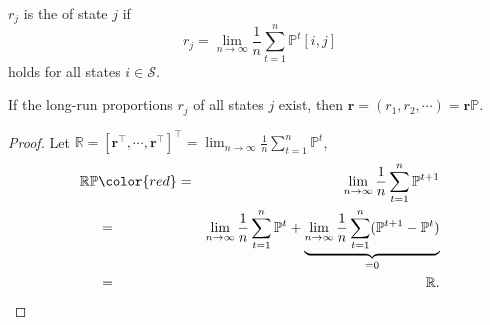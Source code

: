 \begin{definition}
$ r_{j} $ is the  of state $ j $ if
\[ r_{j} = \lim_{n \to \infty} \frac{1}{n} \sum_{t = 1}^{n} \mathbb{P}^{t}[i, j] \]
holds for all states $ i \in \mathcal{S} $.

\begin{comment}
Why this name?

Support $ N $ is a uniform distribution over $ \{ 1, \cdots, n \} $. The ``long-run proportion of state $ j $'' is
\begin{eqnarray*}
  &   & \lim_{n \to \infty} P(X(N) = j \mid X(0) = i) \\
  & = & \lim_{n \to \infty} P(X(N) = j \mid N = t, X(0) = i) \cdot P(N = t \mid X(0) = i) \\
  & = & \lim_{n \to \infty} P(X(N) = j \mid X(0) = i) \cdot \frac{1}{n} \\
  & = & \lim_{n \to \infty} \frac{1}{n} \sum_{t = 1}^{n} \mathbb{P}^{t}[i, j]
\end{eqnarray*}

(Proportion：state 在 t 時間內出現的比例有多高。)
\end{comment}
\end{definition}

\begin{lemma} \label{lem:r-eq-rp}
If the long-run proportions $ r_{j} $ of all states $ j $ exist, then $ \mathbf{r} = (r_{1}, r_{2}, \cdots) = \mathbf{r}\mathbb{P} $.

\begin{proof}
Let $ \mathbb{R} = [\mathbf{r}^{\intercal}, \cdots, \mathbf{r}^{\intercal}]^{\intercal} = \lim_{n \to \infty} \frac{1}{n} \sum_{t = 1}^{n} \mathbb{P}^{t} $,
\begin{eqnarray*}
\mathbb{R}\mathbb{P}
  & {\color{red} =} & \lim_{n \to \infty} \frac{1}{n} \sum_{t = 1}^{n} \mathbb{P}^{t + 1} \\
  & = & \lim_{n \to \infty} \frac{1}{n} \sum_{t = 1}^{n} \mathbb{P}^{t}
      + \underbrace{\lim_{n \to \infty} \frac{1}{n} \sum_{t = 1}^{n} (\mathbb{P}^{t + 1} - \mathbb{P}^{t})}_{= 0} \\
  & = & \mathbb{R}.
\end{eqnarray*}
\end{proof}

\begin{comment}
\begin{eqnarray*}
(\mathbb{R}\mathbb{P})[i, j]
  & = & \sum_{k \in \mathcal{S}} r_{k} \cdot \mathbb{P}[k, j] \\
  & = & \sum_{k \in \mathcal{S}} \left( \lim_{n \to \infty} \frac{1}{n} \sum_{t = 1}^{n} \mathbb{P}^{t}[i, k] \right) \cdot \mathbb{P}[k, j] \\
  & = & \lim_{n \to \infty} \frac{1}{n} \sum_{t = 1}^{n} \sum_{k \in \mathcal{S}} \mathbb{P}^{t}[i, k] \cdot \mathbb{P}[k, j] \\
  & = & \lim_{n \to \infty} \frac{1}{n} \sum_{t = 1}^{n} \mathbb{P}^{t + 1}[i, j]. \\
\end{eqnarray*}
\end{comment}
\end{lemma}

